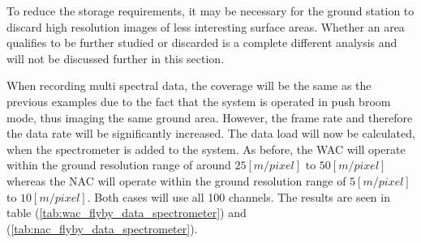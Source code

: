 To reduce the storage requirements, it may be necessary for the ground station to discard high resolution images of less interesting surface areas. Whether an area qualifies to be further studied or discarded is a complete different analysis and will not be discussed further in this section.

When recording multi spectral data, the coverage will be the same as the previous examples due to the fact that the system is operated in push broom mode, thus imaging the same ground area. However, the frame rate and therefore the data rate will be significantly increased. The data load will now be calculated, when the spectrometer is added to the system. As before, the WAC will operate within the ground resolution range of around $25[m/pixel]$ to $50[m/pixel]$ whereas the NAC will operate within the ground resolution range of $5[m/pixel]$ to $10[m/pixel]$. Both cases will use all 100 channels. The results are seen in table (\ref{tab:wac_flyby_data_spectrometer}) and (\ref{tab:nac_flyby_data_spectrometer}).
\begin{table}[htb!]
  \centering
  \caption{The total data generated by the WAC with spectrometer, during a flyby}
  \label{tab:wac_flyby_data_spectrometer}%
\end{table}%
